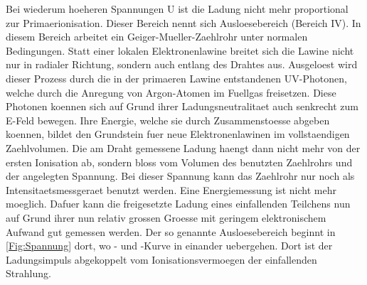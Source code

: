 \documentclass[titlepage=firstcover, captions=tableheading]{scrartcl}
\begin{document}
Bei wiederum hoeheren Spannungen U ist die Ladung nicht mehr proportional zur Primaerionisation. Dieser Bereich nennt sich Ausloesebereich (Bereich IV). In diesem Bereich arbeitet ein Geiger-Mueller-Zaehlrohr unter normalen Bedingungen. Statt einer lokalen Elektronenlawine breitet sich die Lawine nicht nur in radialer Richtung, sondern auch entlang des Drahtes aus. Ausgeloest wird dieser Prozess durch die in der primaeren Lawine entstandenen UV-Photonen, welche durch die Anregung von Argon-Atomen im Fuellgas freisetzen. Diese Photonen koennen sich auf Grund ihrer Ladungsneutralitaet auch senkrecht zum E-Feld bewegen. Ihre Energie, welche sie durch Zusammenstoesse abgeben koennen, bildet den Grundstein fuer neue Elektronenlawinen im vollstaendigen Zaehlvolumen. Die am Draht gemessene Ladung haengt dann nicht mehr von der ersten Ionisation ab, sondern bloss vom Volumen des benutzten Zaehlrohrs und der angelegten Spannung. Bei dieser Spannung kann das Zaehlrohr nur noch als Intensitaetsmessgeraet benutzt werden. Eine Energiemessung ist nicht mehr moeglich. Dafuer kann die freigesetzte Ladung eines einfallenden Teilchens nun auf Grund ihrer nun relativ grossen Groesse mit geringem elektronischem Aufwand gut gemessen werden. Der so genannte Ausloesebereich beginnt in \ref{Fig:Spannung} dort, wo \alpha- und \beta-Kurve in einander uebergehen. Dort ist der Ladungsimpuls abgekoppelt vom Ionisationsvermoegen der einfallenden Strahlung.
\end{document}
